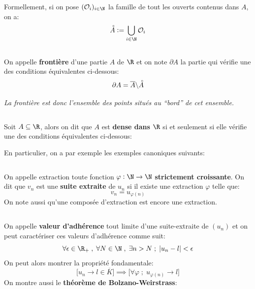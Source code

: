 Formellement, si on pose \((\mathcal{O}_i)_{i \in \N}\) la famille de tout les ouverts contenus dans \(A\), on a:
\[
    \accentset{\circ}{A} := \bigcup_{i \in \N} \mathcal{O}_i
\]

\subsection*{}
On appelle \textbf{frontière} d'une partie \(A\) de \(\R\) et on note \(\partial A\) la partie qui vérifie une des conditions équivalentes ci-dessous:
\[
        \partial A = \overline{A} \backslash \accentset{\circ}{A}
\]
\begin{center}
    \textit{
        La frontière est donc l'ensemble des points situés au ``bord'' de cet ensemble.
    }
\end{center}

\subsection*{}
Soit \(A \subseteq \R\), alors on dit que \(A\) est \textbf{dense dans} \(\R\) si et seulement si elle vérifie une des conditions équivalentes ci-dessous:


En particulier, on a par exemple les exemples canoniques suivants:

\subsection*{}
On appelle extraction toute fonction \(\varphi : \N \rightarrow \N\) \textbf{strictement croissante}.\+
On dit que \(v_n\) est une \textbf{suite extraite} de \(u_n\) si il existe une extraction \(\varphi\) telle que:
\[
    v_n = u_{\varphi(n)}
\]
On note aussi qu'une composée d'extraction est encore une extraction.

\subsection*{}
On appelle \textbf{valeur d'adhérence} tout limite d'une suite-extraite de \((u_n)\) et on peut caractériser ces valeurs d'adhérence comme suit:
\[
    \forall \epsilon \in \R_+ \; , \; \forall N \in \N \; , \; \exists n > N \; ; \; |u_n - l| < \epsilon 
\]
On peut alors montrer la propriété fondamentale:
\[
    \Bigr[u_n \rightarrow l \in \overline{K} \Bigr] \implies \Bigr[ \forall \varphi \; ; \; u_{\varphi(n)} \rightarrow l \Bigr]
\]
On montre aussi le \textbf{théorème de Bolzano-Weirstrass}:

